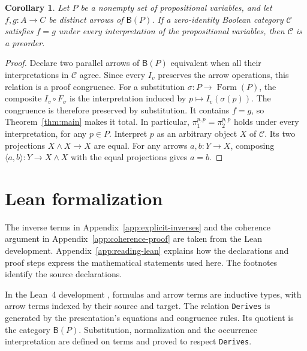 \documentclass[11pt]{article}
\newtheorem{corollary}[theorem]{Corollary}
\newcommand{\B}{\mathsf B}
\newcommand{\FormulaSet}{\operatorname{Form}}
\begin{document}
\begin{corollary}\label{cor:models}
Let $P$ be a nonempty set of propositional variables, and let
$f,g:A\to C$ be distinct arrows of $\B(P)$.
If a zero-identity Boolean category $\mathcal C$ satisfies $f=g$
under every interpretation of the propositional variables, then
$\mathcal C$ is a preorder.
\end{corollary}

\begin{proof}
Declare two parallel arrows of $\B(P)$ equivalent when all their
interpretations in $\mathcal C$ agree. Since every $I_v$ preserves
the arrow operations, this relation is a proof congruence. For a
substitution $\sigma:P\to\FormulaSet(P)$, the composite
$I_v\circ F_\sigma$ is the interpretation induced by
$p\mapsto I_v(\sigma(p))$. The congruence is therefore preserved
by substitution. It contains $f=g$, so
Theorem~\ref{thm:main} makes it total. In particular,
$\pi_1^{p,p}=\pi_2^{p,p}$ holds under every interpretation, for any
$p\in P$. Interpret $p$ as an arbitrary object $X$ of $\mathcal C$.
Its two projections $X\wedge X\to X$ are equal. For any arrows $a,b:Y\to X$, composing
$\langle a,b\rangle:Y\to X\wedge X$ with the equal projections gives $a=b$.
\end{proof}

\section{Lean formalization}\label{sec:formalization}

The inverse terms in Appendix~\ref{app:explicit-inverses} and the
coherence argument in Appendix~\ref{app:coherence-proof} are taken
from the Lean development. Appendix~\ref{app:reading-lean}
explains how the declarations and proof steps express the mathematical
statements used here. The footnotes identify the source declarations.

In the Lean~4 development \cite{Formalization}, formulas and arrow
terms are inductive types, with arrow terms indexed by their source
and target. The relation \texttt{Derives} is generated by the
presentation's equations and congruence rules. Its quotient is the
category $\B(P)$. Substitution, normalization and the occurrence
interpretation are defined on terms and proved to respect
\texttt{Derives}.
\end{document}
